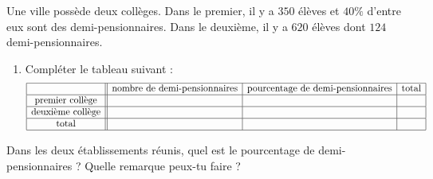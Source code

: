 
Une ville possède deux collèges. Dans le premier, il y a $350$ élèves et $40\%$ d'entre eux sont des demi-pensionnaires.  Dans le deuxième, il y a $620$ élèves dont $124$ demi-pensionnaires.  
\begin{enumerate}
    \item
        Compléter le tableau suivant :
        \begin{equation*}
            \begin{array}[]{|c||c|c|c|}
                \hline
                &\text{nombre de demi-pensionnaires}&\text{pourcentage de demi-pensionnaires}&\text{total}\\
                \hline
                \text{premier collège}&&&\\
                \hline
                \text{deuxième collège}&&&\\
                \hline
                \text{total}&&&\\
                \hline
            \end{array}
        \end{equation*}
\end{enumerate}
Dans les deux établissements réunis, quel est le pourcentage de demi-pensionnaires ?  Quelle remarque peux-tu faire ?
